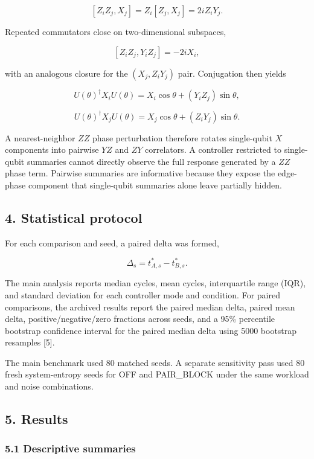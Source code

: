 \documentclass[
]{article}
\begin{document}
\[
[Z_i Z_j, X_j] = Z_i[Z_j,X_j] = 2i Z_i Y_j.
\]

Repeated commutators close on two-dimensional subspaces,

\[
[Z_i Z_j, Y_i Z_j] = -2i X_i,
\]

with an analogous closure for the \((X_j, Z_i Y_j)\) pair. Conjugation
then yields

\[
U(\theta)^\dagger X_i U(\theta) = X_i \cos\theta + (Y_i Z_j) \sin\theta,
\]

\[
U(\theta)^\dagger X_j U(\theta) = X_j \cos\theta + (Z_i Y_j) \sin\theta.
\]

A nearest-neighbor \(ZZ\) phase perturbation therefore rotates
single-qubit \(X\) components into pairwise \(YZ\) and \(ZY\)
correlators. A controller restricted to single-qubit summaries cannot
directly observe the full response generated by a \(ZZ\) phase term.
Pairwise summaries are informative because they expose the edge-phase
component that single-qubit summaries alone leave partially hidden.

\subsection{4. Statistical protocol}\label{statistical-protocol}

For each comparison and seed, a paired delta was formed,

\[
\Delta_s = t^*_{A,s} - t^*_{B,s}.
\]

The main analysis reports median cycles, mean cycles, interquartile
range (IQR), and standard deviation for each controller mode and
condition. For paired comparisons, the archived results report the
paired median delta, paired mean delta, positive/negative/zero fractions
across seeds, and a 95\% percentile bootstrap confidence interval for
the paired median delta using 5000 bootstrap resamples {[}5{]}.

The main benchmark used 80 matched seeds. A separate sensitivity pass
used 80 fresh system-entropy seeds for OFF and PAIR\_BLOCK under the
same workload and noise combinations.

\subsection{5. Results}\label{results}

\subsubsection{5.1 Descriptive summaries}\label{descriptive-summaries}
\end{document}
